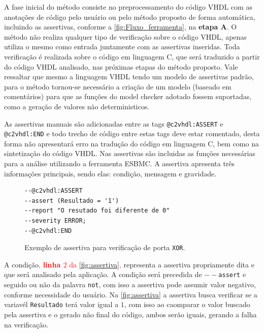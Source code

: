 \par
A fase inicial do método consiste no preprocessamento do código VHDL com as anotações de código pelo usuário ou pelo método proposto de forma automática, incluindo as assertivas, conforme a \autoref{fig:Fluxo_ferramenta}, na \textbf{etapa A}. O método não realiza qualquer tipo de verificação sobre o código VHDL, apenas utiliza o mesmo como entrada juntamente com as assertivas inseridas. Toda verificação é realizada sobre o código em linguagem C, que será traduzido a partir do código VHDL analisado, nas próximas etapas do método proposto.
Vale ressaltar que mesmo a linguagem VHDL tendo um modelo de assertivas padrão, para o método tornou-se necessário a criação de um modelo (baseado em comentários) para que as funções do model checker adotado fossem suportadas, como a geração de valores não deterministicos.


\par
\label{sec:assertiva_descricao} As assertivas manuais são adicionadas entre as tags \texttt{@c2vhdl:ASSERT} e \texttt{@c2vhdl:END} e todo trecho de código entre estas tags deve estar comentado, desta forma não apresentará erro na tradução do código em linguagem C, bem como na sintetização do código VHDL. Nas assertivas são incluidas as funções necessárias para a análise utilizando a ferramenta ESBMC. A assertiva apresenta três informações principais, sendo elas: condição, mensagem e gravidade.

\begin{figure}[H]
\caption{\label{fig:assertiva} Exemplo de assertiva para verificação de porta \texttt{XOR}.}
	\begin{center}
    \begin{minipage}{0.99\textwidth}
    \begin{lstlisting}       
--@c2vhdl:ASSERT
--assert (Resultado = '1')
--report "O resutado foi diferente de 0"
--severity ERROR;
--@c2vhdl:END
    \end{lstlisting}
    \end{minipage}
	\end{center}
\end{figure}


\par
A condição\textcolor{red}{, \textbf{linha $2$} da \autoref{fig:assertiva},} representa a assertiva propriamente dita e que será analisado pela aplicação. A condição será precedida de \texttt{$--$assert} e seguido ou não da palavra \texttt{not}, com isso a assertiva pode assumir valor negativo, conforme necessidade do usuário. Na \autoref{fig:assertiva} a assertiva busca verificar se a variavél \texttt{Resultado} terá valor igual a $1$, com isso ao caomparar o valor buscado pela assertiva e o gerado não final do código, ambos serão iguais, gerando a falha na verificação.

